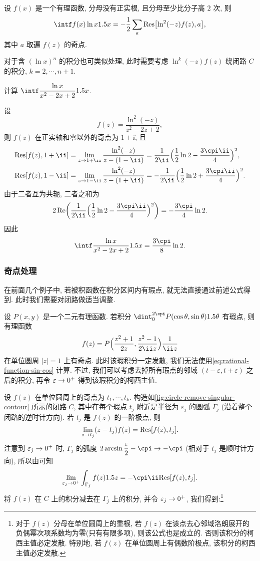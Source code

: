 \begin{theorem}
  \label{thm:integral-ln}
  设 $f(x)$ 是一个有理函数, 分母没有正实根, 且分母至少比分子高 $2$ 次, 则
  \[
    \intf f(x)\ln x\d x
    =-\frac12 \sum_a \Res\bigl[\ln^2(-z)f(z),a\bigr],
  \]
  其中 $a$ 取遍 $f(z)$ 的奇点.
\end{theorem}
对于含 $(\ln x)^n$ 的积分也可类似处理, 此时需要考虑 $\ln^k(-z)f(z)$ 绕闭路 $C$ 的积分, $k=2,\cdots,n+1$.

\begin{exercise}
  计算 $\intf\dfrac{\ln x}{x^2-2x+2}\d x$.
\end{exercise}


\begin{solution}
  设
  \[
    f(z)=\frac{\ln^2(-z)}{z^2-2z+2},
  \]
  则 $f(z)$ 在正实轴和零以外的奇点为 $1\pm\ii$,
  且
  \begin{align*}
     \Res[f(z),1+\ii]&
    =\lim_{z\ra 1+\ii}\frac{\ln^2(-z)}{z-(1-\ii)}
    =\frac1{2\ii}\Bigl(\frac12\ln2-\frac{3\cpi\ii}4\Bigr)^2,
    \\
     \Res[f(z),1-\ii]&
    =\lim_{z\ra 1-\ii}\frac{\ln^2(-z)}{z-(1+\ii)}
    =-\frac1{2\ii}\Bigl(\frac12\ln2+\frac{3\cpi\ii}4\Bigr)^2.
  \end{align*}
  由于二者互为共轭, 二者之和为 
  \[
    2\Re\biggl(\frac1{2\ii}\Bigl(\frac12\ln2-\frac{3\cpi\ii}4\Bigr)^2\biggr)
    =-\frac{3\cpi}4\ln2.
  \]
  因此
  \[
    \intf\dfrac{\ln x}{x^2-2x+2}\d x=\frac{3\cpi}8\ln2.
  \]
\end{solution}


\subsubsection{奇点处理\optional}
在前面几个例子中, 若被积函数在积分区间内有瑕点, 就无法直接通过前述公式得到.
此时我们需要对闭路做适当调整.

设 $P(x,y)$ 是一个二元有理函数.
若积分 $\dint_0^{2\cpi} P(\cos\theta,\sin\theta)\d\theta$ 有瑕点, 则有理函数
\[
  f(z)=P\Bigl(\frac{z^2+1}{2z},\frac{z^2-1}{2\ii z}\Bigr)\frac1{\ii z}
\]
在单位圆周 $|z|=1$ 上有奇点.
此时该瑕积分一定发散, 我们无法使用\eqref{eq:rational-function-sin-cos} 计算.
不过, 我们可以考虑去掉所有瑕点的邻域 $(t-\varepsilon,t+\varepsilon)$ 之后的积分, 再令 $\varepsilon\rightarrow 0^+$ 得到该瑕积分的柯西主值.

设 $f(z)$ 在单位圆周上的奇点为 $t_1,\cdots,t_k$.
构造如\ref{fig:circle-remove-singular-contour} 所示的闭路 $C$, 其中在每个瑕点 $t_j$ 附近是半径为 $\varepsilon_j$ 的圆弧 $\Gamma_j$ (沿着整个闭路的逆时针方向).
若 $t_j$ 是 $f(z)$ 的一阶极点, 则
\[
  \lim_{z\rightarrow t_j} (z-t_j)f(z)={\mathrm{Res}}[f(z),t_j].
\]
注意到 $\varepsilon_j\rightarrow 0^+$ 时, $\Gamma_j$ 的弧度 $2\arcsin\dfrac\varepsilon2-\cpi\ra -\cpi$ (相对于 $t_j$ 是顺时针方向), 所以由\thmsa 可知
\[
  \lim_{\varepsilon_j\ra 0^+}\int_{\Gamma_j}f(z)\d z
  =-\cpi\ii\Res[f(z),t_j].
\]
将 $f(z)$ 在 $C$ 上的积分减去在 $\Gamma_j$ 上的积分, 并令 $\varepsilon_j\rightarrow 0^+$, 我们得到:\footnote{
  对于 $f(z)$ 分母在单位圆周上的重根, 若 $f(z)$ 在该点去心邻域洛朗展开的负偶幂次项系数均为零(只有有限多项), 则该公式也是成立的.
  否则该积分的柯西主值必定发散.
  特别地, 若 $f(z)$ 在单位圆周上有偶数阶极点, 该积分的柯西主值必定发散.
}

